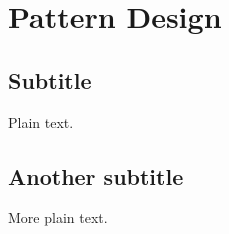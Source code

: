 \documentclass{article}
\begin{document}
\section{Pattern Design}

\subsection{Subtitle}

Plain text.

\subsection{Another subtitle}

More plain text.
\end{document}
